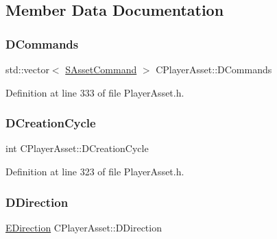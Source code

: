 \subsection{Member Data Documentation}
\hypertarget{classCPlayerAsset_a4d3b96106d3b1c1020f98005884d2a87}{}\label{classCPlayerAsset_a4d3b96106d3b1c1020f98005884d2a87} 
\subsubsection{\texorpdfstring{D\+Commands}{DCommands}}
{\footnotesize\ttfamily std\+::vector$<$ \hyperlink{structSAssetCommand}{S\+Asset\+Command} $>$ C\+Player\+Asset\+::\+D\+Commands\hspace{0.3cm}{\ttfamily [protected]}}



Definition at line 333 of file Player\+Asset.\+h.

\hypertarget{classCPlayerAsset_a8b0efb3ddc27ee11f331ade667bc4b0d}{}\label{classCPlayerAsset_a8b0efb3ddc27ee11f331ade667bc4b0d} 
\subsubsection{\texorpdfstring{D\+Creation\+Cycle}{DCreationCycle}}
{\footnotesize\ttfamily int C\+Player\+Asset\+::\+D\+Creation\+Cycle\hspace{0.3cm}{\ttfamily [protected]}}



Definition at line 323 of file Player\+Asset.\+h.

\hypertarget{classCPlayerAsset_a2f07e280268d0402220c583d1029d683}{}\label{classCPlayerAsset_a2f07e280268d0402220c583d1029d683} 
\subsubsection{\texorpdfstring{D\+Direction}{DDirection}}
{\footnotesize\ttfamily \hyperlink{GameDataTypes_8h_acb2b033915f6659a71a38b5aa6e4eb42}{E\+Direction} C\+Player\+Asset\+::\+D\+Direction\hspace{0.3cm}{\ttfamily [protected]}}



